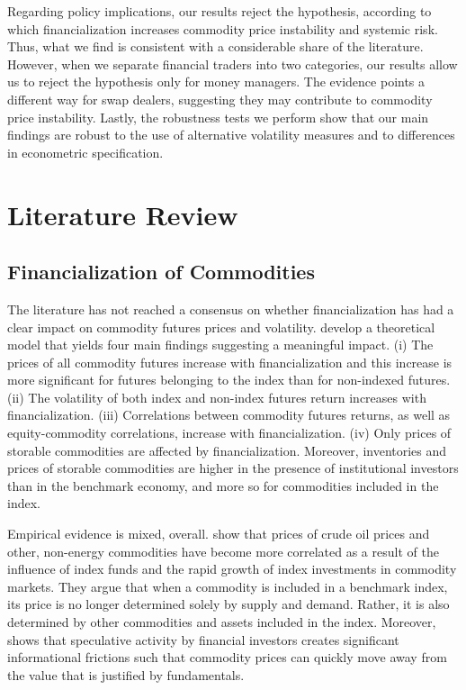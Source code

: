 \documentclass[12pt]{article}
\begin{document}
Regarding policy implications, our results reject the \citet{masters2009testimony} hypothesis, according to which  financialization increases commodity price instability and systemic risk. Thus, what we find is consistent with a considerable share of the literature. However, when we separate financial traders into two categories, our results allow us to reject  the \citet{masters2009testimony} hypothesis only for money managers. The evidence points a different way for swap dealers, suggesting they may contribute to commodity price instability. Lastly, the robustness tests we perform show that our main findings are robust to the use of alternative volatility measures and to differences in econometric specification.



\section{Literature Review}
\subsection{Financialization of Commodities}

The literature has not reached a consensus on whether financialization has had a clear impact on commodity futures prices and volatility. \citet{basak2016model} develop a theoretical model that yields four main findings suggesting a meaningful impact. (i) The prices of all commodity futures increase with financialization and this increase is more significant for futures belonging to the index than for non-indexed futures. (ii) The volatility of both index and non-index futures return increases with financialization. (iii) Correlations between commodity futures returns, as well as equity-commodity correlations, increase with financialization. (iv) Only prices of storable commodities are affected by financialization. Moreover, inventories and prices of storable commodities are higher in the presence of institutional investors than in the benchmark economy, and more so for commodities included in the index.


 Empirical evidence is mixed, overall. \citet{tang2012index} show that prices of crude oil prices and other, non-energy commodities have become more correlated as a result of the influence of index funds and the rapid growth of index investments in commodity markets. They argue that when a commodity is included in a benchmark index, its price is no longer determined solely by supply and demand. Rather, it is also determined by other commodities and assets included in the index. Moreover, \citet{singleton2014investor} shows that speculative activity by financial investors creates significant informational frictions such that commodity prices can quickly move away from the value that is justified by fundamentals. 
\end{document}
